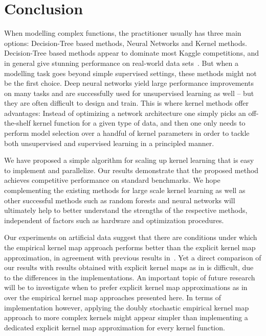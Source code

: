 \documentclass{article} %
\begin{document}
\section{Conclusion}
When modelling complex functions, the practitioner usually has three main options: Decision-Tree based methods, Neural Networks and Kernel methods. Decision-Tree based methods appear to dominate most Kaggle competitions, and in general give stunning performance on real-world data sets~\cite{Caruana2006}. But when a modelling task goes beyond simple supervised settings, these methods might not be the first choice. Deep neural networks yield large performance improvements on many tasks and are successfully used for unsupervised learning as well -- but they are often difficult to design and train. 
This is where kernel methods offer advantages: Instead of optimizing a network architecture one simply picks an off-the-shelf kernel function for a given type of data, and then one only needs to perform model selection over a handful of kernel parameters in order to tackle both unsupervised and supervised learning in a principled manner.

We have proposed a simple algorithm for scaling up kernel learning that is easy to implement and parallelize. Our results demonstrate that the proposed method achieves competitive performance on standard benchmarks. We hope complementing the existing methods for large scale kernel learning as well as other successful methods such as random forests and neural networks will ultimately help to better understand the strengths of the respective methods, independent of factors such as hardware and optimization procedures. 

Our experiments on artificial data suggest that there are conditions under which the empirical kernel map approach performs better than the explicit kernel map approximation, in agreement with previous results in~\cite{Vedaldi2010}. Yet a direct comparison of our results with results obtained with explicit kernel maps as in \cite{Dai2014} is difficult, due to the differences in the implementations. An important topic of future research will be to investigate when to prefer explicit kernel map approximations as in \cite{Rahimi2008, Dai2014} over the empirical kernel map approaches presented here. In terms of implementation however, applying the doubly stochastic empirical kernel map approach to more complex kernels might appear simpler than implementing a dedicated explicit kernel map approximation for every kernel function. 
\end{document}
